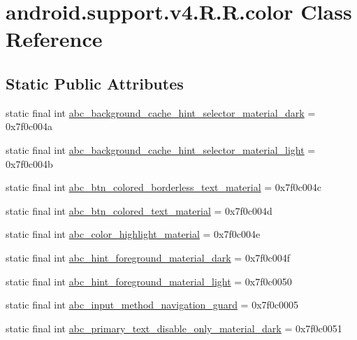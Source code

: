 \hypertarget{classandroid_1_1support_1_1v4_1_1_r_1_1color}{
\section{android.support.v4.R.R.color Class Reference}
\label{classandroid_1_1support_1_1v4_1_1_r_1_1color}
}
\subsection*{Static Public Attributes}
\begin{CompactItemize}
\item 
static final int \hyperlink{classandroid_1_1support_1_1v4_1_1_r_1_1color_0438f97b49c0fb046bdb7f89b22f1be2}{abc\_\-background\_\-cache\_\-hint\_\-selector\_\-material\_\-dark} = 0x7f0c004a
\item 
static final int \hyperlink{classandroid_1_1support_1_1v4_1_1_r_1_1color_0f5aecf9b5d313f6387c8a283ddd8b97}{abc\_\-background\_\-cache\_\-hint\_\-selector\_\-material\_\-light} = 0x7f0c004b
\item 
static final int \hyperlink{classandroid_1_1support_1_1v4_1_1_r_1_1color_db044fc6fb0b2672c466bda83f273351}{abc\_\-btn\_\-colored\_\-borderless\_\-text\_\-material} = 0x7f0c004c
\item 
static final int \hyperlink{classandroid_1_1support_1_1v4_1_1_r_1_1color_0eb86b3f9767fde9aad9f36a8c6e122b}{abc\_\-btn\_\-colored\_\-text\_\-material} = 0x7f0c004d
\item 
static final int \hyperlink{classandroid_1_1support_1_1v4_1_1_r_1_1color_1f2fce363c36af2301410f2806601212}{abc\_\-color\_\-highlight\_\-material} = 0x7f0c004e
\item 
static final int \hyperlink{classandroid_1_1support_1_1v4_1_1_r_1_1color_d441c3876b02056431ac6ddd21bb80f4}{abc\_\-hint\_\-foreground\_\-material\_\-dark} = 0x7f0c004f
\item 
static final int \hyperlink{classandroid_1_1support_1_1v4_1_1_r_1_1color_eac462d5cf575eec9a42e2db7bf493b9}{abc\_\-hint\_\-foreground\_\-material\_\-light} = 0x7f0c0050
\item 
static final int \hyperlink{classandroid_1_1support_1_1v4_1_1_r_1_1color_754d1755bdf92d6e98013235a76ca7dc}{abc\_\-input\_\-method\_\-navigation\_\-guard} = 0x7f0c0005
\item 
static final int \hyperlink{classandroid_1_1support_1_1v4_1_1_r_1_1color_990a329452cd85fe3c2a761570b33124}{abc\_\-primary\_\-text\_\-disable\_\-only\_\-material\_\-dark} = 0x7f0c0051

\end{CompactItemize}

